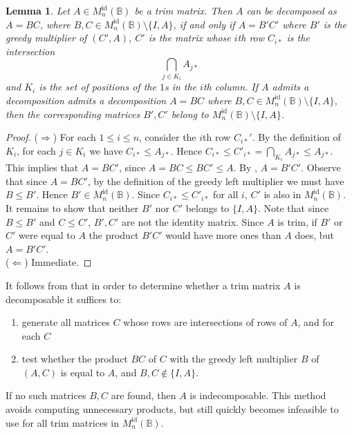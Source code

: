 \documentclass[11pt]{article}
\newtheorem{lemma}[thm]{Lemma}
\numberwithin{equation}{section}
\newcommand{\B}{\mathbb{B}}
\newcommand{\Refln}{M_n^{\text{id}}(\B)}
\begin{document}
\begin{lemma}
  Let $A \in \Refln$ be a trim matrix. Then $A$ can be decomposed as $A = BC$,
  where $B, C \in \Refln\setminus\{I, A\}$, if and only if $A = B'C'$ where $B'$
  is the greedy multiplier of $(C', A)$, $C'$ is the matrix whose $i$th row
  $C_{i*}$ is the intersection 
  \[\bigcap_{j \in K_i} A_{j*} \]
  and $K_i$ is the set of positions of the $1$s in the $i$th column. If $A$
  admits a decomposition admits a decomposition $A = BC$ where $B, C \in
  \Refln\setminus\{I, A\}$, then the corresponding matrices  $B', C'$ belong to
  $\Refln \setminus\{I, A\}$.
\end{lemma}
\begin{proof}
  ($\Rightarrow$)
  For each $1 \leq i \leq n$, consider the $i$th row $C_{i*}'$. By the
  definition of $K_i$, for each $j \in K_i$ we have $C_{i*} \leq A_{j*}$. Hence
  $C_{i*} \leq C'_{i*} = \bigcap_{K_i} A_{j*} \leq A_{j*}$. This implies that $A
  = BC'$, since $A = BC \leq BC' \leq A$. By , $A =
  B'C'$.  Observe that since $A = BC'$, by the definition of the greedy left
  multiplier we must have $B \leq B'$. Hence $B' \in \Refln$. Since $C_{i*} \leq
  C'_{i*}$ for all $i$, $C'$ is also in $\Refln$. It remains to show that neither
  $B'$ nor $C'$ belongs to $\{I, A\}$. Note that since $B \leq B'$ and $C \leq
  C'$, $B', C'$ are not the identity matrix. Since $A$ is trim, if $B'$ or $C'$
  were equal to $A$ the product $B'C'$ would have more ones than $A$ does, but
  $A = B'C'$.\\
  ($\Leftarrow$) Immediate.
\end{proof}
It follows from  that in order to determine
whether a trim matrix $A$ is decomposable it suffices to:
\begin{enumerate}
  \item generate all matrices $C$ whose rows are intersections of rows of $A$,
    and for each $C$
  \item test whether the product $BC$ of $C$ with the greedy left multiplier
    $B$ of $(A, C)$ is equal to $A$, and $B, C \not\in \{I, A\}$.
\end{enumerate}
If no such matrices $B, C$ are found, then $A$ is indecomposable. This method
avoids computing unnecessary products, but still quickly becomes infeasible to
use for all trim matrices in $\Refln$.\\
\end{document}
